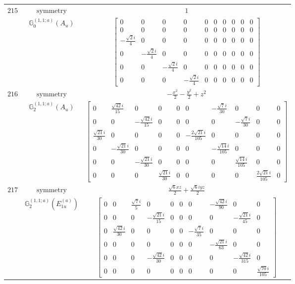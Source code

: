 \documentclass[fleqn,8pt,landscape]{jsarticle}
\begin{document}
\begin{longtable}{ccc}
$ 215 $ & $ \text{symmetry} $ & $ 1 $ \\
$  $ & $ \mathbb{G}_{0}^{(1,1;a)}(A_{u}) $ & $ \begin{bmatrix} 0 & 0 & 0 & 0 & 0 & 0 & 0 & 0 & 0 & 0 \\ 0 & 0 & 0 & 0 & 0 & 0 & 0 & 0 & 0 & 0 \\ - \frac{\sqrt{2} i}{4} & 0 & 0 & 0 & 0 & 0 & 0 & 0 & 0 & 0 \\ 0 & - \frac{\sqrt{2} i}{4} & 0 & 0 & 0 & 0 & 0 & 0 & 0 & 0 \\ 0 & 0 & - \frac{\sqrt{2} i}{4} & 0 & 0 & 0 & 0 & 0 & 0 & 0 \\ 0 & 0 & 0 & - \frac{\sqrt{2} i}{4} & 0 & 0 & 0 & 0 & 0 & 0 \end{bmatrix} $ \\ \hline
$ 216 $ & $ \text{symmetry} $ & $ - \frac{x^{2}}{2} - \frac{y^{2}}{2} + z^{2} $ \\
$  $ & $ \mathbb{G}_{2}^{(1,1;a)}(A_{u}) $ & $ \begin{bmatrix} 0 & \frac{\sqrt{42} i}{15} & 0 & 0 & 0 & 0 & - \frac{\sqrt{7} i}{30} & 0 & 0 & 0 \\ 0 & 0 & - \frac{\sqrt{42} i}{15} & 0 & 0 & 0 & 0 & - \frac{\sqrt{7} i}{30} & 0 & 0 \\ \frac{\sqrt{21} i}{30} & 0 & 0 & 0 & 0 & - \frac{2 \sqrt{21} i}{105} & 0 & 0 & 0 & 0 \\ 0 & - \frac{\sqrt{21} i}{30} & 0 & 0 & 0 & 0 & - \frac{\sqrt{14} i}{105} & 0 & 0 & 0 \\ 0 & 0 & - \frac{\sqrt{21} i}{30} & 0 & 0 & 0 & 0 & \frac{\sqrt{14} i}{105} & 0 & 0 \\ 0 & 0 & 0 & \frac{\sqrt{21} i}{30} & 0 & 0 & 0 & 0 & \frac{2 \sqrt{21} i}{105} & 0 \end{bmatrix} $ \\ \hline
$ 217 $ & $ \text{symmetry} $ & $ \frac{\sqrt{6} x z}{2} + \frac{\sqrt{6} i y z}{2} $ \\
$  $ & $ \mathbb{G}_{2}^{(1,1;a)}(E_{1u}^{(a)}) $ & $ \begin{bmatrix} 0 & 0 & \frac{\sqrt{7} i}{5} & 0 & 0 & 0 & 0 & - \frac{\sqrt{42} i}{90} & 0 & 0 \\ 0 & 0 & 0 & - \frac{\sqrt{21} i}{15} & 0 & 0 & 0 & 0 & - \frac{\sqrt{21} i}{45} & 0 \\ 0 & \frac{\sqrt{42} i}{30} & 0 & 0 & 0 & 0 & - \frac{\sqrt{7} i}{35} & 0 & 0 & 0 \\ 0 & 0 & 0 & 0 & 0 & 0 & 0 & - \frac{\sqrt{21} i}{63} & 0 & 0 \\ 0 & 0 & 0 & - \frac{\sqrt{42} i}{30} & 0 & 0 & 0 & 0 & - \frac{\sqrt{42} i}{315} & 0 \\ 0 & 0 & 0 & 0 & 0 & 0 & 0 & 0 & 0 & \frac{\sqrt{70} i}{105} \end{bmatrix} $ \\ \hline

\end{longtable}
\end{document}
